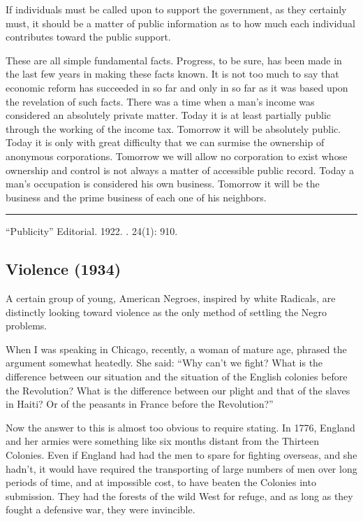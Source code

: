 \documentclass[letterpaper,10pt,english]{jupyterBook}
\begin{document}
\sphinxAtStartPar
If individuals must be called upon to support the government, as they certainly must, it should be a matter of public information as to how much each individual contributes toward the public support.

\sphinxAtStartPar
These are all simple fundamental facts. Progress, to be sure, has been made in the last few years in making these facts known. It is not too much to say that economic reform has succeeded in so far and only in so far as it was based upon the revelation of such facts. There was a time when a man’s income was considered an absolutely private matter. Today it is at least partially public through the working of the income tax. Tomorrow it will be absolutely public. Today it is only with great difficulty that we can surmise the ownership of anonymous corporations. Tomorrow we will allow no corporation to exist whose ownership and control is not always a matter of accessible public record. Today a man’s occupation is considered his own business. Tomorrow it will be the business and the prime business of each one of his neighbors.


\bigskip\hrule\bigskip


\sphinxAtStartPar
{} “Publicity” Editorial. 1922. . 24(1): 9\sphinxhyphen{}10.


\subsection{Violence (1934)}
\label{\detokenize{Volumes/41/05/violence:violence-1934}}\label{\detokenize{Volumes/41/05/violence::doc}}
\sphinxAtStartPar
A certain group of young, American Negroes, inspired by white Radicals, are distinctly looking toward violence as the only method of settling the Negro problems.

\sphinxAtStartPar
When I was speaking in Chicago, recently, a woman of mature age, phrased the argument somewhat heatedly. She said: “Why can’t we fight? What is the difference between our situation and the situation of the English colonies before the Revolution? What is the difference between our plight and that of the slaves in Haiti? Or of the peasants in France before the Revolution?”

\sphinxAtStartPar
Now the answer to this is almost too obvious to require stating. In 1776, England and her armies were something like six months distant from the Thirteen Colonies. Even if England had had the men to spare for fighting overseas, and she hadn’t, it would have required the transporting of large numbers of men over long periods of time, and at impossible cost, to have beaten the Colonies into submission. They had the forests of the wild West for refuge, and as long as they fought a defensive war, they were invincible.
\end{document}

